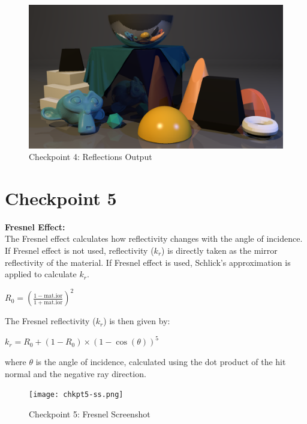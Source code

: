 \documentclass[a4paper]{report}
\begin{document}
\begin{figure}[H]
    \begin{adjustbox}{lap=-1.5cm}
        \includegraphics[width=1.2\textwidth]{chkpt4.png}
    \end{adjustbox}
    \caption{Checkpoint 4: Reflections Output}
    \label{fig:chkpt4}
\end{figure}

\section*{Checkpoint 5}

\textbf{Fresnel Effect:} \\
The Fresnel effect calculates how reflectivity changes with the angle of incidence.
If Fresnel effect is not used, reflectivity ($k_r$) is directly taken as the mirror reflectivity of the material.
If Fresnel effect is used, Schlick's approximation is applied to calculate $k_r$.

\begin{center}
    $R_0 = \left(\frac{1 - \text{mat.ior}}{1 + \text{mat.ior}}\right)^2$
\end{center}

The Fresnel reflectivity ($k_r$) is then given by:
\begin{center}
    $k_r = R_0 + (1 - R_0) \times (1 - \cos(\theta))^5$
\end{center}

where $\theta$ is the angle of incidence, calculated using the dot product of the hit normal and the negative ray direction.

\begin{figure}[H]
    \begin{adjustbox}{lap=-1.5cm}
        \texttt{[image: chkpt5-ss.png]}
    \end{adjustbox}
    \caption{Checkpoint 5: Fresnel Screenshot}
    \label{fig:chkpt5-ss}
\end{figure}
\end{document}
